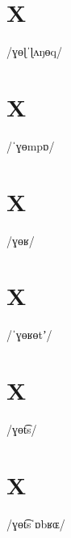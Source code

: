 \documentclass[10pt,a4paper,twoside]{book}
\begin{document}
\section*{X}

\begin{multicols}{3}
 {/ɣɵɭˈɭʌŋɵq/} {}
\end{multicols}

\section*{X}

\begin{multicols}{3}
 {/ˈɣɵmpɒ/} {}
\end{multicols}

\section*{X}

\begin{multicols}{3}
 {/ɣɵʁ/} {}
\end{multicols}

\section*{X}

\begin{multicols}{3}
 {/ˈɣɵʁɵtʼ/} {}
\end{multicols}

\section*{X}

\begin{multicols}{3}
 {/ɣɵt͡s/} {}
\end{multicols}

\section*{X}

\begin{multicols}{3}
 {/ɣɵt͡sˈɒbʁɶ/} {}
\end{multicols}
\end{document}

